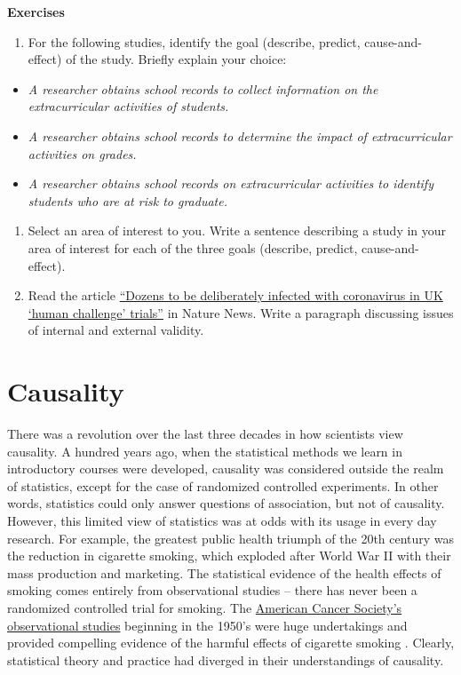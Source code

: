 \documentclass[
]{book}
\providecommand{\tightlist}{%
  \setlength{\itemsep}{0pt}\setlength{\parskip}{0pt}}
\begin{document}
\textbf{Exercises}

\begin{enumerate}
\def\labelenumi{\arabic{enumi}.}
\tightlist
\item
  For the following studies, identify the goal (describe, predict, cause-and-effect) of the study. Briefly explain your choice:
\end{enumerate}

\begin{itemize}
\item
  \emph{A researcher obtains school records to collect information on the extracurricular activities of students.}
\item
  \emph{A researcher obtains school records to determine the impact of extracurricular activities on grades.}
\item
  \emph{A researcher obtains school records on extracurricular activities to identify students who are at risk to graduate.}
\end{itemize}

\begin{enumerate}
\def\labelenumi{\arabic{enumi}.}
\setcounter{enumi}{1}
\item
  Select an area of interest to you. Write a sentence describing a study in your area of interest for each of the three goals (describe, predict, cause-and-effect).
\item
  Read the article \href{https://www.nature.com/articles/d41586-020-02821-4}{``Dozens to be deliberately infected with coronavirus in UK `human challenge' trials''} in Nature News. Write a paragraph discussing issues of internal and external validity.
\end{enumerate}

\hypertarget{causality}{%
\chapter{Causality}\label{causality}}

There was a revolution over the last three decades in how scientists view causality. A hundred years ago, when the statistical methods we learn in introductory courses were developed, causality was considered outside the realm of statistics, except for the case of randomized controlled experiments. In other words, statistics could only answer questions of association, but not of causality. However, this limited view of statistics was at odds with its usage in every day research. For example, the greatest public health triumph of the 20th century was the reduction in cigarette smoking, which exploded after World War II with their mass production and marketing. The statistical evidence of the health effects of smoking comes entirely from observational studies -- there has never been a randomized controlled trial for smoking. The \href{https://www.cancer.org/latest-news/the-study-that-helped-spur-the-us-stop-smoking-movement.html}{American Cancer Society's observational studies} beginning in the 1950's were huge undertakings and provided compelling evidence of the harmful effects of cigarette smoking \citep{hammond1954relationship, hammond1966smoking}. Clearly, statistical theory and practice had diverged in their understandings of causality.
\end{document}
